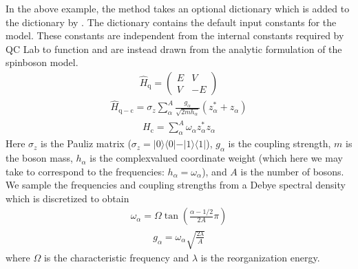 \documentclass[letterpaper,10pt,english]{sphinxmanual}
\begin{document}
\sphinxAtStartPar
In the above example, the  method takes an optional  dictionary which is added to the  dictionary by
. The  dictionary contains the default input constants for the model. These constants are independent from the
internal constants required by QC Lab to function and are instead drawn from the analytic formulation of the spin\sphinxhyphen{}boson model.
\begin{equation*}
\begin{split}\hat{H}_{\mathrm{q}} = \left(\begin{array}{cc} E & V \\ V & -E \end{array}\right)\end{split}
\end{equation*}\begin{equation*}
\begin{split}\hat{H}_{\mathrm{q-c}} = \sigma_{z} \sum_{\alpha}^{A}  \frac{g_{\alpha}}{\sqrt{2mh_{\alpha}}} \left(z^{*}_{\alpha} + z_{\alpha}\right)\end{split}
\end{equation*}\begin{equation*}
\begin{split}H_{\mathrm{c}} = \sum_{\alpha}^{A} \omega_{\alpha} z^{*}_{\alpha} z_{\alpha}\end{split}
\end{equation*}
\sphinxAtStartPar
Here \(\sigma_{z}\) is the Pauli\sphinxhyphen{}z matrix (\(\sigma_{z}=\vert0\rangle\langle 0\vert - \vert 1\rangle\langle 1\vert\)), \(g_{\alpha}\) is the coupling strength,
\(m\) is the boson mass, \(h_{\alpha}\) is the complex\sphinxhyphen{}valued coordinate weight (which here we may take to correspond to the frequencies: \(h_{\alpha}=\omega_{\alpha}\)),
and \(A\) is the number of bosons. We sample the frequencies and coupling strengths from a Debye spectral density which is discretized to obtain
\begin{equation*}
\begin{split}\omega_{\alpha} = \Omega\tan\left(\frac{\alpha - 1/2}{2A}\pi\right)\end{split}
\end{equation*}\begin{equation*}
\begin{split}g_{\alpha} = \omega_{\alpha}\sqrt{\frac{2\lambda}{A}}\end{split}
\end{equation*}
\sphinxAtStartPar
where \(\Omega\) is the characteristic frequency and \(\lambda\) is the reorganization energy.
\end{document}
